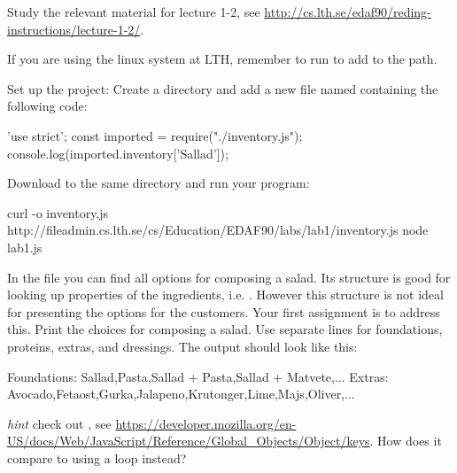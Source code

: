 \documentclass[fleqn, article, a4paper]{memoir}
\begin{document}
\begin{Assignments}

\item Study the relevant material for lecture 1-2, see \url{http://cs.lth.se/edaf90/reding-instructions/lecture-1-2/}. 

\item If you are using the linux system at LTH, remember to run  to add  to the path.

\item %
Set up the project: Create a directory and add a new file named  containing the following code:
\begin{Code}
'use strict';
const imported = require("./inventory.js");
console.log(imported.inventory['Sallad']);
\end{Code}
\noindent Download  to the same directory and run your  program:
\begin{Code}
curl -o inventory.js http://fileadmin.cs.lth.se/cs/Education/EDAF90/labs/lab1/inventory.js
node lab1.js
\end{Code}



\item In the  file you can find all options for composing a salad. Its structure is good for looking up properties of the ingredients, i.e. . However this structure is not ideal for presenting the options for the customers. Your first assignment is to address this. Print the choices for composing a salad. Use separate lines for foundations, proteins, extras, and dressings. The output should look like this:
\begin{Code}
Foundations: Sallad,Pasta,Sallad + Pasta,Sallad + Matvete,...
Extras: Avocado,Fetaost,Gurka,Jalapeno,Krutonger,Lime,Majs,Oliver,...
\end{Code}
\emph{hint} check out , see \url{https://developer.mozilla.org/en-US/docs/Web/JavaScript/Reference/Global_Objects/Object/keys}. How does it compare to using a  loop instead?


\end{Assignments}
\end{document}
